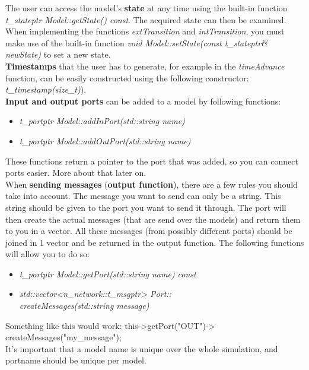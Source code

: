 The user can access the model's \textbf{state} at any time using the built-in function \textsl{t\_stateptr Model::getState() const}. The acquired state can then be examined. When implementing the functions \textsl{extTransition} and \textsl{intTransition}, you must make use of the built-in function \textsl{void Model::setState(const t\_stateptr\& newState)} to set a new state.\\

\textbf{Timestamps} that the user has to generate, for example in the \textsl{timeAdvance} function, can be easily constructed using the following constructor:\\ \textsl{t\_timestamp(size\_t)}).\\

\textbf{Input and output ports} can be added to a model by following functions:
\begin{itemize}
	\item \textsl{t\_portptr Model::addInPort(std::string name)}
	\item \textsl{t\_portptr Model::addOutPort(std::string name)}
\end{itemize}
These functions return a pointer to the port that was added, so you can connect ports easier. More about that later on. \\

When \textbf{sending messages} (\textbf{output function}), there are a few rules you should take into account. The message you want to send can only be a string. This string should be given to the port you want to send it through. The port will then create the actual messages (that are send over the models) and return them to you in a vector. All these messages (from possibly different ports) should be joined in 1 vector and be returned in the output function. The following functions will allow you to do so:
\begin{itemize}
	\item \textsl{t\_portptr Model::getPort(std::string name) const}
	\item \textsl{std::vector{\textless}n\_network::t\_msgptr{\textgreater} Port:: \\createMessages(std::string message)}
\end{itemize} 
Something like this would work: this-{\textgreater}getPort("OUT")-{\textgreater} \\createMessages("my\_message"); \\

It's important that a model name is unique over the whole simulation, and portname should be unique per model.\\

